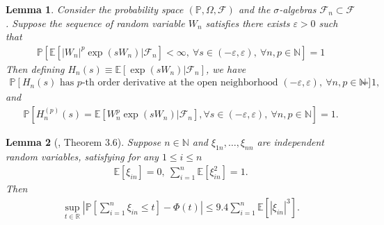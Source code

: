 \documentclass[12pt]{article}
\newtheorem{lemma}{Lemma}
\theoremstyle{definition}
\def\P{\mathbb{P}}
\def\P{\mathbb{P}}
\newcommand{\E}{\mathbb E}								%
\renewcommand{\P}{\mathbb{P}}							%
\begin{document}
\begin{lemma}\label{lem:existence_derivative_CGF}
	Consider the probability space $(\P,\Omega,\mathcal{F})$ and the $\sigma$-algebras $\mathcal{F}_n\subset \mathcal{F}$. Suppose the sequence of random variable $W_n$ satisfies there exists $\varepsilon>0$ such that 
	\begin{align*}
		\P\left[\E[|W_n|^p\exp(sW_n)|\mathcal{F}_n]<\infty,\ \forall s\in(-\varepsilon,\varepsilon),\ \forall n,p\in\mathbb{N}\right]=1
	\end{align*}
	Then defining $H_n(s)\equiv \E[\exp(sW_n)|\mathcal{F}_n]$, we have
	\begin{align*}
		\P\left[H_n(s) \text{ has }p\text{-th order derivative at the open neighborhood }(-\varepsilon,\varepsilon),\ \forall n,p\in\mathbb{N}\right]=1,
	\end{align*}
	and
	\begin{align*}
		\P\left[H_n^{(p)}(s)=\E[W_n^p\exp(sW_n)|\mathcal{F}_n],\forall s\in (-\varepsilon,\varepsilon),\ \forall n,p \in\mathbb{N}\right]=1.
	\end{align*}
\end{lemma}


\begin{lemma}[\cite{Chen2011}, Theorem 3.6]\label{lem:berry-esseen}
    Suppose $n\in\mathbb{N}$ and $\xi_{1n},\ldots,\xi_{nn}$ are independent random variables, satisfying for any $1\leq i\leq n$
    \begin{align*}
        \E[\xi_{in}]=0,\ \sum_{i=1}^n\E[\xi_{in}^2]=1.
    \end{align*}
	Then 
    \begin{align*}
        \sup_{t\in\mathbb{R}}\left|\P\left[\sum_{i=1}^n \xi_{in}\leq t\right]-\Phi(t)\right|\leq 9.4\sum_{i=1}^n \E[|\xi_{in}|^3].
    \end{align*}
\end{lemma}
\end{document}
